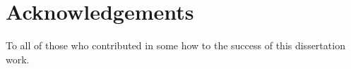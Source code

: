 \chapter*{Acknowledgements}

To all of those who contributed in some how to the success of this dissertation work.

\vspace{10mm}
